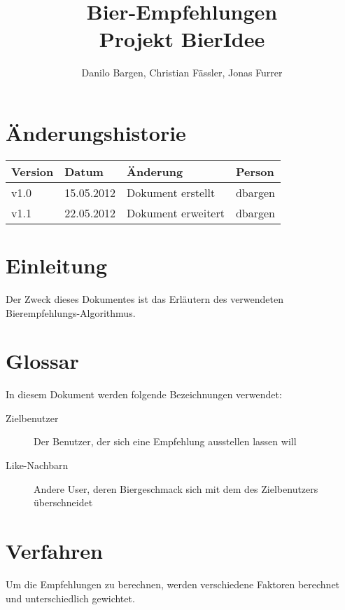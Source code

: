 \documentclass[10pt,a4paper]{scrartcl}
\author{Danilo Bargen, Christian Fässler, Jonas Furrer}
\title{Bier-Empfehlungen\\ Projekt BierIdee}
\begin{document}
\begin{titlepage}
	\maketitle
	\vspace{120mm}
	\thispagestyle{empty} %
\end{titlepage}

\tableofcontents
\newpage

\section*{Änderungshistorie}
\begin{tabular}{p{}p{}p{}p{}}
\toprule
\textbf{Version} & \textbf{Datum} & \textbf{Änderung} & \textbf{Person} \\  
\midrule
v1.0 & 15.05.2012 & Dokument erstellt & dbargen \\  
\hline
v1.1 & 22.05.2012 & Dokument erweitert & dbargen \\  
\bottomrule
\end{tabular} 
\newpage


\section{Einleitung}

Der Zweck dieses Dokumentes ist das Erläutern des verwendeten Bierempfehlungs-Algorithmus.


\section{Glossar}

In diesem Dokument werden folgende Bezeichnungen verwendet:

\begin{description}
	\item[Zielbenutzer] Der Benutzer, der sich eine Empfehlung ausstellen lassen will
	\item[Like-Nachbarn] Andere User, deren Biergeschmack sich mit dem des Zielbenutzers überschneidet
\end{description}


\section{Verfahren}

Um die Empfehlungen zu berechnen, werden verschiedene Faktoren berechnet und unterschiedlich
gewichtet.
\end{document}
